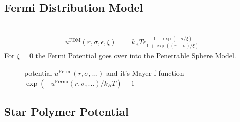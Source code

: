 \newpage
\subsection{Fermi Distribution Model}
~\\
\begin{align}
u^\text{FDM}(r,\sigma,\epsilon,\xi) &=
k_\text{B} T \epsilon
\frac{1+\exp\left(-\sigma/\xi\right)}{1+\exp\left(\left(r-\sigma\right)/\xi\right)}
\end{align}
For $\xi = 0$ the Fermi Potential goes over into the Penetrable Sphere Model.

\begin{figure}[htb]
\captionsetup[subfigure]{position=b}
\centering
{}
\hfill
{}
\caption{potential $u^\text{Fermi}(r,\sigma,\ldots)$ and it's Mayer-f function $\exp(-u^\text{Fermi}(r,\sigma,\ldots)/k_BT)-1$}
\end{figure}

\newpage
\subsection{Star Polymer Potential}
~\\

